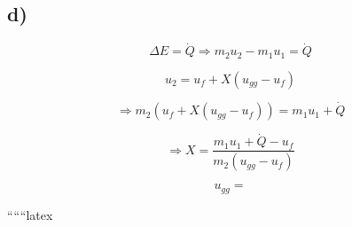 

\subsection*{d)}

\begin{equation*}
\Delta E = \dot{Q} \Rightarrow m_2 u_2 - m_1 u_1 = \dot{Q}
\end{equation*}

\begin{equation*}
u_2 = u_f + X (u_{gg} - u_f)
\end{equation*}

\begin{equation*}
\Rightarrow m_2 (u_f + X (u_{gg} - u_f)) = m_1 u_1 + \dot{Q}
\end{equation*}

\begin{equation*}
\Rightarrow X = \frac{m_1 u_1 + \dot{Q} - u_f}{m_2 (u_{gg} - u_f)}
\end{equation*}

\begin{equation*}
u_{gg} =
\end{equation*}

``````latex